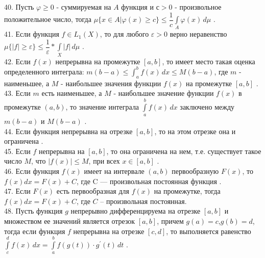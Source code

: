 \documentclass[12pt]{article}
\begin{document}
{40. Пусть ${\displaystyle \varphi \geq 0}$ - суммируемая на ${\displaystyle A}$ функция и ${\displaystyle с>0}$ - произвольное положительное число, тогда ${\displaystyle \mu\{x \in A \vert \varphi(x) \geq c\} \leq \dfrac{1}{c}\int \limits _{A} \varphi(x) \, d\mu}$ .\\

41. Если функция ${\displaystyle f \in L_1(X)}$, то для любого ${\displaystyle \varepsilon>0}$ верно неравенство ${\displaystyle \mu\{|f| \geq \varepsilon\} \leq \dfrac{1}{\varepsilon}*\int \limits _{X} |f| \, d\mu}$ .\\

42. Если ${\displaystyle f(x)}$ непрерывна на промежутке ${\displaystyle [a,b]}$, то имеет место такая оценка определенного интеграла: ${\displaystyle m(b-a)\leq \int _{a}^{b} f(x)\,dx\leq M(b-a)}$, где ${\displaystyle m}$ - наименьшее, а ${\displaystyle M}$ - наибольшее значения функции ${\displaystyle f(x)}$ на промежутке ${\displaystyle [a,b]}$ .\\

43. Если ${\displaystyle m}$ есть наименьшее, а ${\displaystyle M}$ - наибольшее значение функции ${\displaystyle f(x)}$ в промежутке ${\displaystyle (a,b)}$, то значение интеграла ${\displaystyle \int \limits _{a}^{b} f(x) \, dx}$ заключено между ${\displaystyle m(b-a)}$ и ${\displaystyle M(b-a)}$ .\\

44. Если функция непрерывна на отрезке  ${\displaystyle [a,b]}$, то на этом отрезке она и ограничена .\\

45. Если ${\displaystyle f}$ непрерывна на ${\displaystyle [a,b]}$, то она ограничена на нем, т.е. существует такое число ${\displaystyle M}$, что ${\displaystyle |f(x)| \leq M}$, при всех ${\displaystyle x \in [a,b]}$ .\\

46. Если функция ${\displaystyle f(x)}$ имеет на интервале ${\displaystyle (a, b)}$ первообразную ${\displaystyle F(x)}$, то ${\displaystyle f(x) dx = F(x) + C }$, где C — произвольная постоянная функция .\\

47. Если ${\displaystyle F(x)}$ есть первообразная для ${\displaystyle f(x)}$ на промежутке, тогда ${\displaystyle f(x) dx = F(x) + C }$, где ${\displaystyle C}$ – произвольная постоянная.\\

48. Пусть функция ${\displaystyle g}$ непрерывно дифференцируема на отрезке ${\displaystyle [a,b]}$ и множеством ее значений является отрезок ${\displaystyle [a,b]}$, причем ${\displaystyle g(a)=c}$,${\displaystyle g(b)=d}$, тогда если функция ${\displaystyle f}$ непрерывна на отрезке ${\displaystyle [c,d]}$, то выполняется равенство ${\displaystyle \int \limits _{c}^{d} f(x) \, dx=\int \limits _{a}^{b} f(g(t))\cdot g^{\prime}(t) \, dt}$ .\\

}
\end{document}
